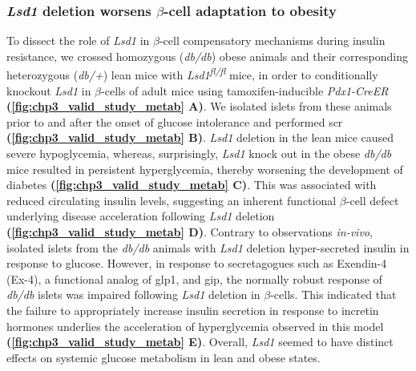 \subsubsection{\large \textit{Lsd1} deletion worsens $\beta$-cell adaptation to obesity}


To dissect the role of \textit{Lsd1} in $\beta$-cell compensatory mechanisms during insulin resistance, we crossed homozygous (\textit{db/db}) obese animals and their corresponding heterozygous (\textit{db/+}) lean mice with \textit{Lsd1\textsuperscript{fl/fl}} mice, in order to conditionally knockout \textit{Lsd1} in $\beta$-cells of adult mice using tamoxifen-inducible \textit{Pdx1-CreER} \textbf{(\autoref{fig:chp3_valid_study_metab} A)}. We isolated islets from these animals prior to and after the onset of glucose intolerance and performed \gls{scr} \textbf{(\autoref{fig:chp3_valid_study_metab} B)}. \textit{Lsd1} deletion in the lean mice caused severe hypoglycemia, whereas, surprisingly, \textit{Lsd1} knock out in the obese \textit{db/db} mice resulted in persistent hyperglycemia, thereby worsening the development of diabetes \textbf{(\autoref{fig:chp3_valid_study_metab} C)}. This was associated with reduced circulating insulin levels, suggesting an inherent functional $\beta$-cell defect underlying disease acceleration following \textit{Lsd1} deletion \textbf{(\autoref{fig:chp3_valid_study_metab} D)}. Contrary to observations \textit{in-vivo}, isolated islets from the \textit{db/db} animals with \textit{Lsd1} deletion hyper-secreted insulin in response to glucose. However, in response to secretagogues such as Exendin-4 (Ex-4), a functional analog of \gls{glp1}, and \gls{gip}, the normally robust response of \textit{db/db} islets was impaired following \textit{Lsd1} deletion in $\beta$-cells. This indicated that the failure to appropriately increase insulin secretion in response to incretin hormones underlies the acceleration of hyperglycemia observed in this model \textbf{(\autoref{fig:chp3_valid_study_metab} E)}. Overall, \textit{Lsd1} seemed to have distinct effects on systemic glucose metabolism in lean and obese states.


